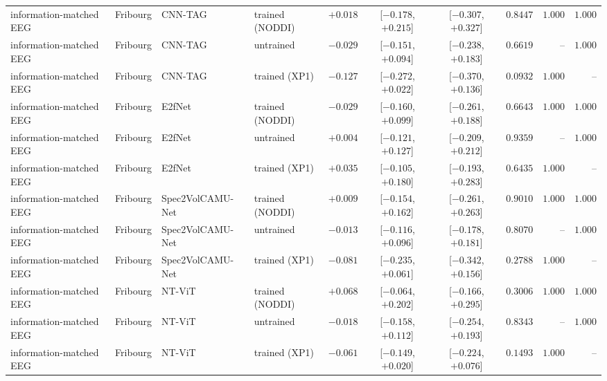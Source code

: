 \documentclass[10pt]{article}
\begin{document}
\begin{longtable}{l l l l r c c r r r}
        information-matched EEG & Fribourg & CNN-TAG & trained (NODDI) & $+0.018$ & [$-0.178$, $+0.215$] & [$-0.307$, $+0.327$] & $0.8447$ & $1.000$ & $1.000$ \\
        information-matched EEG & Fribourg & CNN-TAG & untrained & $-0.029$ & [$-0.151$, $+0.094$] & [$-0.238$, $+0.183$] & $0.6619$ & -- & $1.000$ \\
        information-matched EEG & Fribourg & CNN-TAG & trained (XP1) & $-0.127$ & [$-0.272$, $+0.022$] & [$-0.370$, $+0.136$] & $0.0932$ & $1.000$ & -- \\
        information-matched EEG & Fribourg & E2fNet & trained (NODDI) & $-0.029$ & [$-0.160$, $+0.099$] & [$-0.261$, $+0.188$] & $0.6643$ & $1.000$ & $1.000$ \\
        information-matched EEG & Fribourg & E2fNet & untrained & $+0.004$ & [$-0.121$, $+0.127$] & [$-0.209$, $+0.212$] & $0.9359$ & -- & $1.000$ \\
        information-matched EEG & Fribourg & E2fNet & trained (XP1) & $+0.035$ & [$-0.105$, $+0.180$] & [$-0.193$, $+0.283$] & $0.6435$ & $1.000$ & -- \\
        information-matched EEG & Fribourg & Spec2VolCAMU-Net & trained (NODDI) & $+0.009$ & [$-0.154$, $+0.162$] & [$-0.261$, $+0.263$] & $0.9010$ & $1.000$ & $1.000$ \\
        information-matched EEG & Fribourg & Spec2VolCAMU-Net & untrained & $-0.013$ & [$-0.116$, $+0.096$] & [$-0.178$, $+0.181$] & $0.8070$ & -- & $1.000$ \\
        information-matched EEG & Fribourg & Spec2VolCAMU-Net & trained (XP1) & $-0.081$ & [$-0.235$, $+0.061$] & [$-0.342$, $+0.156$] & $0.2788$ & $1.000$ & -- \\
        information-matched EEG & Fribourg & NT-ViT & trained (NODDI) & $+0.068$ & [$-0.064$, $+0.202$] & [$-0.166$, $+0.295$] & $0.3006$ & $1.000$ & $1.000$ \\
        information-matched EEG & Fribourg & NT-ViT & untrained & $-0.018$ & [$-0.158$, $+0.112$] & [$-0.254$, $+0.193$] & $0.8343$ & -- & $1.000$ \\
        information-matched EEG & Fribourg & NT-ViT & trained (XP1) & $-0.061$ & [$-0.149$, $+0.020$] & [$-0.224$, $+0.076$] & $0.1493$ & $1.000$ & -- \\
\bottomrule
\end{longtable}
\end{document}
